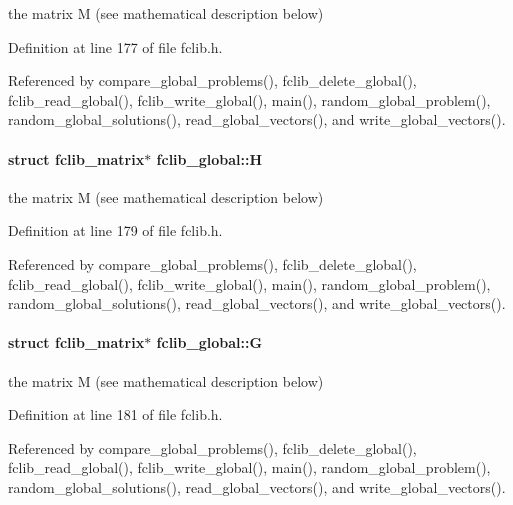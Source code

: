 the matrix M (see mathematical description below) 



Definition at line 177 of file fclib.\+h.



Referenced by compare\+\_\+global\+\_\+problems(), fclib\+\_\+delete\+\_\+global(), fclib\+\_\+read\+\_\+global(), fclib\+\_\+write\+\_\+global(), main(), random\+\_\+global\+\_\+problem(), random\+\_\+global\+\_\+solutions(), read\+\_\+global\+\_\+vectors(), and write\+\_\+global\+\_\+vectors().

\hypertarget{structfclib__global_ac87d5553d144625b9006e2e8b0c89b3c}{}
\paragraph[{H}]{\setlength{\rightskip}{0pt plus 5cm}struct {\bf fclib\+\_\+matrix}$\ast$ fclib\+\_\+global\+::\+H}\label{structfclib__global_ac87d5553d144625b9006e2e8b0c89b3c}


the matrix M (see mathematical description below) 



Definition at line 179 of file fclib.\+h.



Referenced by compare\+\_\+global\+\_\+problems(), fclib\+\_\+delete\+\_\+global(), fclib\+\_\+read\+\_\+global(), fclib\+\_\+write\+\_\+global(), main(), random\+\_\+global\+\_\+problem(), random\+\_\+global\+\_\+solutions(), read\+\_\+global\+\_\+vectors(), and write\+\_\+global\+\_\+vectors().

\hypertarget{structfclib__global_a897c09aca4a010076ed9ddb3f7527a79}{}
\paragraph[{G}]{\setlength{\rightskip}{0pt plus 5cm}struct {\bf fclib\+\_\+matrix}$\ast$ fclib\+\_\+global\+::\+G}\label{structfclib__global_a897c09aca4a010076ed9ddb3f7527a79}


the matrix M (see mathematical description below) 



Definition at line 181 of file fclib.\+h.



Referenced by compare\+\_\+global\+\_\+problems(), fclib\+\_\+delete\+\_\+global(), fclib\+\_\+read\+\_\+global(), fclib\+\_\+write\+\_\+global(), main(), random\+\_\+global\+\_\+problem(), random\+\_\+global\+\_\+solutions(), read\+\_\+global\+\_\+vectors(), and write\+\_\+global\+\_\+vectors().

